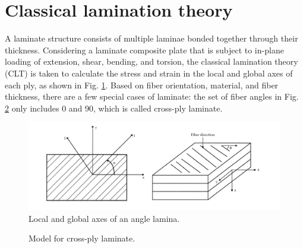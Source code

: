 \documentclass[10pt, journal]{IEEEtran}
\begin{document}
\section{Classical lamination theory}
A laminate structure consists of multiple laminae bonded together through their
thickness.  Considering a laminate composite plate that is subject to in-plane
loading of extension, shear, bending, and torsion, the classical lamination
theory (CLT) is taken to calculate the stress and strain in the local and
global axes of each ply, as shown in Fig. \ref{fig:lamina}. Based on fiber
orientation, material, and fiber thickness, there are a few special cases of
laminate: the set of fiber angles in Fig. \ref{fig:cross_ply} only includes 0
and 90, which is called cross-ply laminate.

\begin{figure}[!b]
	\centering
	\includegraphics[width=\linewidth]{lamina_local_global_axes.png}
	\caption{Local and global axes of an angle lamina.}
  	\label{fig:lamina}
\end{figure}

\begin{figure}[!b]
	\centering
{}
\caption{Model for cross-ply laminate.}
\label{fig:cross_ply}
\end{figure}
\end{document}
